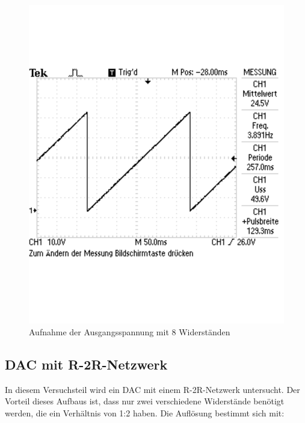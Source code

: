 \documentclass[12pt,a4paper]{article}
\begin{document}
\begin{figure}[H] 
  \centering 	
    \includegraphics[trim = 0mm 50mm 0mm 50mm, clip, scale = 0.4]{1_1_2.pdf}
  	\caption[Aufnahme der Ausgangsspannung mit 8 Widerständen]{Aufnahme der Ausgangsspannung mit 8 Widerständen} 
  \label{fig:1_1_2}
\end{figure}



\subsection{DAC mit R-2R-Netzwerk}

In diesem Versuchsteil wird ein DAC mit einem R-2R-Netzwerk untersucht. Der Vorteil dieses Aufbaus ist, dass nur zwei verschiedene Widerstände benötigt werden, die ein Verhältnis von 1:2 haben. Die Auflösung bestimmt sich mit:
\end{document}
